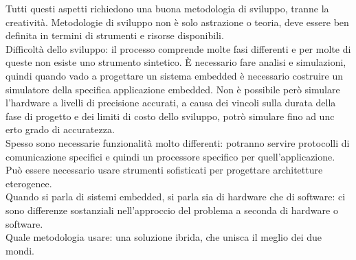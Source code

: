 \documentclass{article}
\begin{document}
Tutti questi aspetti richiedono una buona metodologia di sviluppo, tranne la creatività. Metodologie di sviluppo non è solo astrazione o teoria, deve essere ben definita in termini di strumenti e risorse disponibili.\\ Difficoltà dello sviluppo: il processo comprende molte fasi differenti e per molte di queste non esiste uno strumento sintetico. È necessario fare analisi e simulazioni, quindi quando vado a progettare un sistema embedded è necessario costruire un simulatore della specifica applicazione embedded. Non è possibile però simulare l'hardware a livelli di precisione accurati, a causa dei vincoli sulla durata della fase di progetto e dei limiti di costo dello sviluppo, potrò simulare fino ad unc erto grado di accuratezza.\\ Spesso sono necessarie funzionalità molto differenti: potranno servire protocolli di comunicazione specifici e quindi un processore specifico per quell'applicazione. Può essere necessario usare strumenti sofisticati per progettare architetture eterogenee.\\ Quando si parla di sistemi embedded, si parla sia di hardware che di software: ci sono differenze sostanziali nell'approccio del problema a seconda di hardware o software.\\ Quale metodologia usare: una soluzione ibrida, che unisca il meglio dei due mondi.
\end{document}
